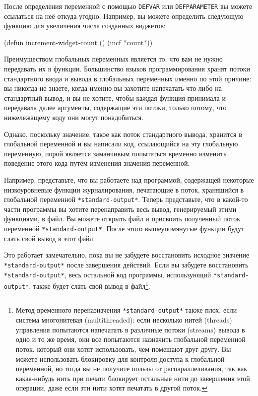 После определения переменной с помощью \lstinline{DEFVAR} или \lstinline{DEFPARAMETER} вы
можете ссылаться на неё откуда угодно. Например, вы можете определить следующую функцию
для увеличения числа созданных виджетов:

\begin{myverb}
(defun increment-widget-count () (incf *count*))
\end{myverb}

Преимуществом глобальных переменных является то, что вам не нужно передавать их в
функции. Большинство языков программирования хранят потоки стандартного ввода и вывода в
глобальных переменных именно по этой причине: вы никогда не знаете, когда именно вы
захотите напечатать что-либо на стандартный вывод, и вы не хотите, чтобы каждая функция
принимала и передавала далее аргументы, содержащие эти потоки, только потому, что
нижележащему коду они могут понадобиться.

Однако, поскольку значение, такое как поток стандартного вывода, хранится в глобальной
переменной и вы написали код, ссылающийся на эту глобальную переменную, порой является
заманчивым попытаться временно изменить поведение этого кода путём изменения значения
переменной.

Например, представьте, что вы работаете над программой, содержащей некоторые
низкоуровневые функции журналирования, печатающие в поток, хранящийся в глобальной
переменной \lstinline{*standard-output*}. Теперь представьте, что в какой-то части программы вы
хотите перенаправить весь вывод, генерируемый этими функциями, в файл. Вы можете открыть
файл и присвоить полученный поток переменной \lstinline{*standard-output*}. После этого
вышеупомянутые функции будут слать свой вывод в этот файл.

Это работает замечательно, пока вы не забудете восстановить исходное значение
\lstinline{*standard-output*} после завершения действий. Если вы забудете восстановить
\lstinline{*standard-output*}, весь остальной код программы, использующий
\lstinline{*standard-output*}, также будет слать свой вывод в файл\footnote{Метод временного
  переназначения \lstinline{*standard-output*} также плох, если система многонитевая
  (multithreaded): если несколько нитей (threads) управления попытаются напечатать в
  различные потоки (streams) вывода в одно и то же время, они все попытаются назначить
  глобальной переменной поток, который они хотят использовать, чем помешают друг другу. Вы
  можете использовать блокировку для контроля доступа к глобальной переменной, но тогда вы
  не получите пользы от распараллеливания, так как какая-нибудь нить при печати блокирует
  остальные нити до завершения этой операции, даже если эти нити хотят печатать в другой
  поток.}\hspace{\footnotenegspace}.

